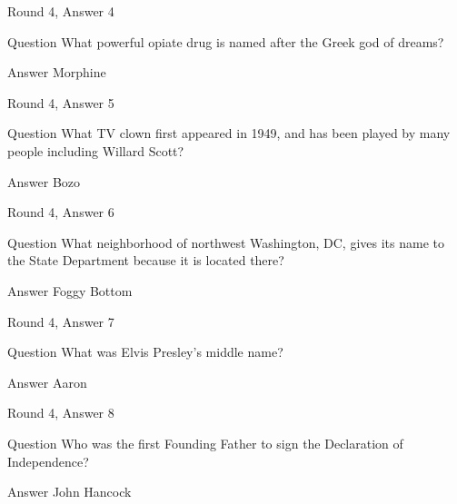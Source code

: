 \documentclass[11pt]{beamer}
\begin{document}
\begin{frame}[t]{Round 4, Answer 4}
\vspace{2em}
\begin{block}{Question}
What powerful opiate drug is named after the Greek god of dreams\@?
\end{block}
\pause{}
\begin{block}{Answer}
Morphine
\end{block}
\end{frame}
    

\begin{frame}[t]{Round 4, Answer 5}
\vspace{2em}
\begin{block}{Question}
What TV clown first appeared in 1949, and has been played by many people including Willard Scott\@?
\end{block}
\pause{}
\begin{block}{Answer}
Bozo
\end{block}
\end{frame}
    

\begin{frame}[t]{Round 4, Answer 6}
\vspace{2em}
\begin{block}{Question}
What neighborhood of northwest Washington, DC, gives its name to the State Department because it is located there\@?
\end{block}
\pause{}
\begin{block}{Answer}
Foggy Bottom
\end{block}
\end{frame}
    

\begin{frame}[t]{Round 4, Answer 7}
\vspace{2em}
\begin{block}{Question}
What was Elvis Presley's middle name\@?
\end{block}
\pause{}
\begin{block}{Answer}
Aaron
\end{block}
\end{frame}
    

\begin{frame}[t]{Round 4, Answer 8}
\vspace{2em}
\begin{block}{Question}
Who was the first Founding Father to sign the Declaration of Independence\@?
\end{block}
\pause{}
\begin{block}{Answer}
John Hancock
\end{block}
\end{frame}
    
\end{document}
